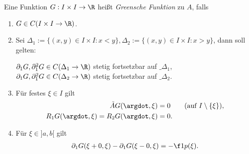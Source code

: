 \begin{df} \label{3.11}
	Eine Funktion $G: I \times I \to \R$ heißt \emph{Greensche Funktion} zu $A$, falls
	\begin{enumerate}[1)]
		\item
			$G \in C(I\times I \to \R)$.
		\item
			Sei $\Delta_1:=\{(x,y)\in I \times I : x < y\}, \Delta_2:=\{(x,y)\in I \times I : x > y\}$, dann soll gelten:

			$\partial_1 G, \partial_1^2 G \in C(\Delta_1 \to \R)$ stetig fortsetzbar auf $\_{\Delta_1}$, \\
			$\partial_1 G, \partial_1^2 G \in C(\Delta_2 \to \R)$ stetig fortsetzbar auf $\_{\Delta_2}$.
		\item
			Für festes $\xi \in I$ gilt
			\begin{align*}
				\tilde A G(\argdot, \xi) &= 0 \qquad \text{(auf $I \setminus \{\xi\}$)}, \\
				R_1 G(\argdot, \xi) = R_2 G(\argdot, \xi) &= 0.
			\end{align*}
		\item
			Für $\xi \in ]a,b[$ gilt
			\begin{align*}
				\partial_1 G (\xi + 0, \xi) - \partial_1 G(\xi - 0, \xi) = -\f 1{p(\xi)}.
			\end{align*}
	\end{enumerate}
\end{df}


